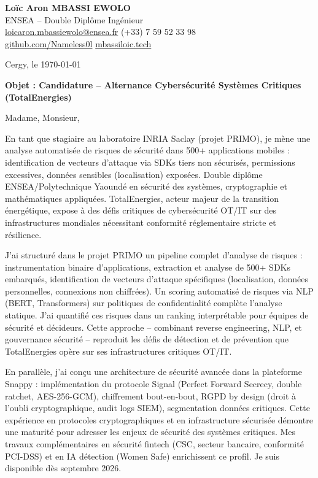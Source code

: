 \documentclass[a4paper,11pt]{article}
\begin{document}
\noindent \textbf{Lo\"ic Aron MBASSI EWOLO} \\
ENSEA -- Double Dipl\^ome Ing\'enieur \\
\href{mailto:loicaron.mbassiewolo@ensea.fr}{loicaron.mbassiewolo@ensea.fr} \quad (+33) 7 59 52 33 98 \\
\href{https://github.com/Nameless0l}{github.com/Nameless0l} \quad \href{https://mbassiloic.tech}{mbassiloic.tech}

\vspace{1em}
\noindent Cergy, le \today

\vspace{1em}
\noindent \textbf{Objet : Candidature -- Alternance Cybersécurité Syst\`emes Critiques (TotalEnergies)}

\vspace{1.5em}
\noindent Madame, Monsieur,

\vspace{0.8em}
\noindent En tant que stagiaire au laboratoire INRIA Saclay (projet PRIMO), je mène une analyse automatisée de risques de sécurité dans 500+ applications mobiles : identification de vecteurs d'attaque via SDKs tiers non sécurisés, permissions excessives, données sensibles (localisation) exposées. Double diplôme ENSEA/Polytechnique Yaoundé en sécurité des systèmes, cryptographie et mathématiques appliquées. TotalEnergies, acteur majeur de la transition énergétique, expose à des défis critiques de cybersécurité OT/IT sur des infrastructures mondiales nécessitant conformité réglementaire stricte et résilience.

\vspace{0.8em}
\noindent J'ai structuré dans le projet PRIMO un pipeline complet d'analyse de risques : instrumentation binaire d'applications, extraction et analyse de 500+ SDKs embarqués, identification de vecteurs d'attaque spécifiques (localisation, données personnelles, connexions non chiffrées). Un scoring automatisé de risques via NLP (BERT, Transformers) sur politiques de confidentialité complète l'analyse statique. J'ai quantifié ces risques dans un ranking interprétable pour équipes de sécurité et décideurs. Cette approche -- combinant reverse engineering, NLP, et gouvernance sécurité -- reproduit les défis de détection et de prévention que TotalEnergies opère sur ses infrastructures critiques OT/IT.

\vspace{0.8em}
\noindent En parallèle, j'ai conçu une architecture de sécurité avancée dans la plateforme Snappy : implémentation du protocole Signal (Perfect Forward Secrecy, double ratchet, AES-256-GCM), chiffrement bout-en-bout, RGPD by design (droit à l'oubli cryptographique, audit logs SIEM), segmentation données critiques. Cette expérience en protocoles cryptographiques et en infrastructure sécurisée démontre une maturité pour adresser les enjeux de sécurité des systèmes critiques. Mes travaux complémentaires en sécurité fintech (CSC, secteur bancaire, conformité PCI-DSS) et en IA détection (Women Safe) enrichissent ce profil. Je suis disponible dès septembre 2026.
\end{document}

